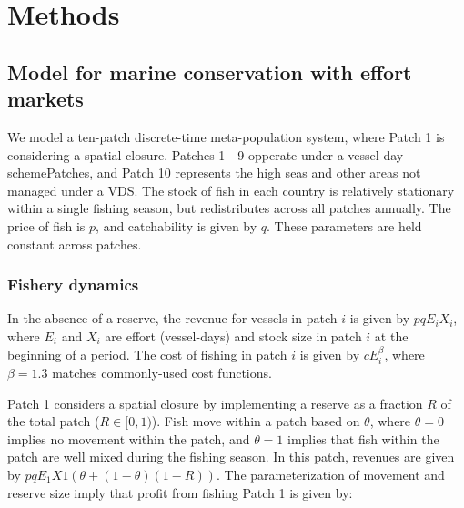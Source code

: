 \documentclass[12pt]{article}
\begin{document}
\clearpage

\FloatBarrier

\newcommand{\beginsupplement}{\setcounter{table}{0}  \renewcommand{\thetable}{S\arabic{table}} \setcounter{figure}{0} \renewcommand{\thefigure}{S\arabic{figure}}}

\setcounter{table}{0}  \renewcommand{\thetable}{S\arabic{table}} \setcounter{figure}{0} \renewcommand{\thefigure}{S\arabic{figure}}

\section{Methods}

\subsection{Model for marine conservation with effort markets}

We model a ten-patch discrete-time meta-population system, where Patch 1 is considering a spatial closure. Patches 1 - 9 opperate under a vessel-day schemePatches, and Patch 10 represents the high seas and other areas not managed under a VDS. The stock of fish in each country is relatively stationary within a single fishing season, but redistributes across all patches annually. The price of fish is $p$, and catchability is given by $q$. These parameters are held constant across patches.

\subsubsection{Fishery dynamics}

In the absence of a reserve, the revenue for vessels in patch $i$ is given by $pqE_iX_i$, where $E_i$ and $X_i$ are effort (vessel-days) and stock size in patch $i$ at the beginning of a period. The cost of fishing in patch $i$ is given by $cE_i^\beta$, where $\beta = 1.3$ matches commonly-used cost functions.

Patch 1 considers a spatial closure by implementing a reserve as a fraction $R$ of the total patch ($R \in[0,1)$). Fish move within a patch based on $\theta$, where $\theta = 0$ implies no movement within the patch, and $\theta = 1$ implies that fish within the patch are well mixed during the fishing season. In this patch, revenues are given by $pqE_1X1(\theta + (1 - \theta)(1 - R))$. The parameterization of movement and reserve size imply that profit from fishing Patch 1 is given by:
\end{document}
